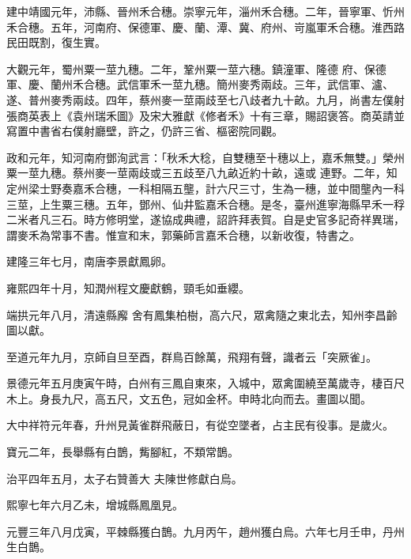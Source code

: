 \begin{pinyinscope}
 建中靖國元年，沛縣、晉州禾合穗。崇寧元年，淄州禾合穗。二年，晉寧軍、忻州禾合穗。五年，河南府、保德軍、慶、蘭、潭、冀、府州、岢嵐軍禾合穗。淮西路民田既割，復生實。



 大觀元年，蜀州粟一莖九穗。二年，鞏州粟一莖六穗。鎮潼軍、隆德
 府、保德軍、慶、蘭州禾合穗。武信軍禾一莖九穗。簡州麥秀兩歧。三年，武信軍、瀘、遂、普州麥秀兩歧。四年，蔡州麥一莖兩歧至七八歧者九十畝。九月，尚書左僕射張商英表上《袁州瑞禾圖》及宋大雅獻《修者禾》十有三章，賜詔褒答。商英請並寫置中書省右僕射廳壁，許之，仍許三省、樞密院同觀。



 政和元年，知河南府鄧洵武言：「秋禾大稔，自雙穗至十穗以上，嘉禾無雙。」榮州粟一莖九穗。蔡州麥一莖兩歧或三五歧至八九畝近約十畝，遠或
 連野。二年，知定州梁士野奏嘉禾合穗，一科相隔五壟，計六尺三寸，生為一穗，並中間壟內一科三莖，上生粟三穗。五年，鄧州、仙井監嘉禾合穗。是冬，臺州進寧海縣早禾一稃二米者凡三石。時方修明堂，遂協成典禮，詔許拜表賀。自是史官多記奇祥異瑞，謂麥禾為常事不書。惟宣和末，郭藥師言嘉禾合穗，以新收復，特書之。



 建隆三年七月，南唐李景獻鳳卵。



 雍熙四年十月，知潤州程文慶獻鶴，頸毛如垂纓。



 端拱元年八月，清遠縣廨
 舍有鳳集柏樹，高六尺，眾禽隨之東北去，知州李昌齡圖以獻。



 至道元年九月，京師自旦至酉，群鳥百餘萬，飛翔有聲，識者云「突厥雀」。



 景德元年五月庚寅午時，白州有三鳳自東來，入城中，眾禽圍繞至萬歲寺，棲百尺木上。身長九尺，高五尺，文五色，冠如金杯。申時北向而去。畫圖以聞。



 大中祥符元年春，升州見黃雀群飛蔽日，有從空墜者，占主民有役事。是歲火。



 寶元二年，長舉縣有白鵲，觜腳紅，不類常鵲。



 治平四年五月，太子右贊善大
 夫陳世修獻白烏。



 熙寧七年六月乙未，增城縣鳳凰見。



 元豐三年八月戊寅，平棘縣獲白鵲。九月丙午，趙州獲白烏。六年七月壬申，丹州生白鵲。




\end{pinyinscope}
